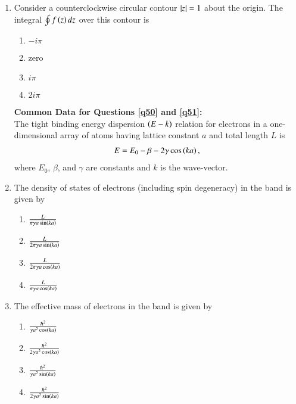 \documentclass[journal]{IEEEtran}
\begin{document}
\begin{enumerate}
    \item \label{q49} Consider a counterclockwise circular contour $\left\vert z\right\vert = 1$ about the origin. The integral
    $\oint f\left(z\right) dz$ over this contour is
    \begin{multicols}{4}
        \begin{enumerate}
            \item $-i\pi$
            \item zero
            \item $i\pi$
            \item $2i\pi$
        \end{enumerate}
    \end{multicols}

    \textbf{Common Data for Questions \ref{q50} and \ref{q51}:} \\
    The tight binding energy dispersion $\left(E-k\right)$ relation for electrons in a one-dimensional
    array of atoms having lattice constant $a$ and total length $L$ is 
    \begin{align*}    
    E = E_0 - \beta - 2\gamma \cos\left(ka\right),
    \end{align*}
    where $E_0$, $\beta$, and $\gamma$ are constants and $k$ is the wave-vector.

    \item \label{q50} The density of states of electrons (including spin degeneracy) in the band is given by
    \begin{multicols}{4}
        \begin{enumerate}
            \item $\frac{L}{\pi \gamma a \sin\left(ka\right)}$
            \item $\frac{L}{2\pi \gamma a \sin\left(ka\right)}$
            \item $\frac{L}{2\pi \gamma a \cos\left(ka\right)}$
            \item $\frac{L}{\pi \gamma a \cos\left(ka\right)}$
        \end{enumerate}
    \end{multicols}
    
    \item \label{q51} The effective mass of electrons in the band is given by
    \begin{multicols}{4}
        \begin{enumerate}
            \item $\frac{\hbar^2}{\gamma a^2 \cos\left(ka\right)}$
            \item $\frac{\hbar^2}{2\gamma a^2 \cos\left(ka\right)}$
            \item $\frac{\hbar^2}{\gamma a^2 \sin\left(ka\right)}$
            \item $\frac{\hbar^2}{2\gamma a^2 \sin\left(ka\right)}$
        \end{enumerate}
    \end{multicols}


\end{enumerate}
\end{document}
